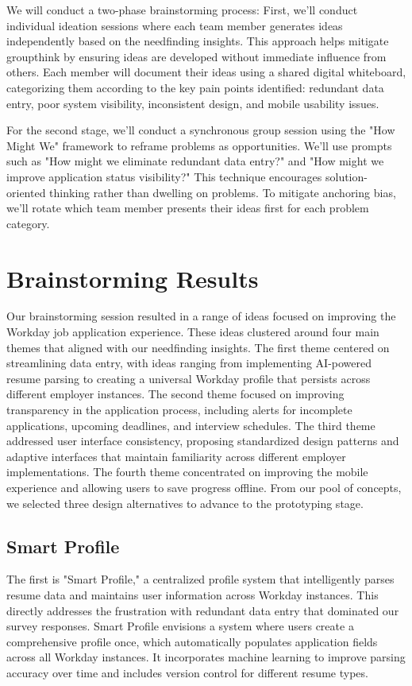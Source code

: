 \documentclass[
	letterpaper, %
]{jdf}
\begin{document}
\begin{sloppypar}
We will conduct a two-phase brainstorming process: First, we'll conduct individual ideation sessions where each team member generates ideas independently based on the needfinding insights. This approach helps mitigate groupthink by ensuring ideas are developed without immediate influence from others. Each member will document their ideas using a shared digital whiteboard, categorizing them according to the key pain points identified: redundant data entry, poor system visibility, inconsistent design, and mobile usability issues.

For the second stage, we'll conduct a synchronous group session using the "How Might We" framework to reframe problems as opportunities. We'll use prompts such as "How might we eliminate redundant data entry?" and "How might we improve application status visibility?" This technique encourages solution-oriented thinking rather than dwelling on problems. To mitigate anchoring bias, we'll rotate which team member presents their ideas first for each problem category.
\hfill \break

\section{Brainstorming Results}
Our brainstorming session resulted in a range of ideas focused on improving the Workday job application experience. These ideas clustered around four main themes that aligned with our needfinding insights. The first theme centered on streamlining data entry, with ideas ranging from implementing AI-powered resume parsing to creating a universal Workday profile that persists across different employer instances. The second theme focused on improving transparency in the application process, including alerts for incomplete applications, upcoming deadlines, and interview schedules. The third theme addressed user interface consistency, proposing standardized design patterns and adaptive interfaces that maintain familiarity across different employer implementations. The fourth theme concentrated on improving the mobile experience and allowing users to save progress offline. From our pool of concepts, we selected three design alternatives to advance to the prototyping stage.

\subsection{Smart Profile}
The first is "Smart Profile," a centralized profile system that intelligently parses resume data and maintains user information across Workday instances. This directly addresses the frustration with redundant data entry that dominated our survey responses. Smart Profile envisions a system where users create a comprehensive profile once, which automatically populates application fields across all Workday instances. It incorporates machine learning to improve parsing accuracy over time and includes version control for different resume types. 


\end{sloppypar}
\end{document}
